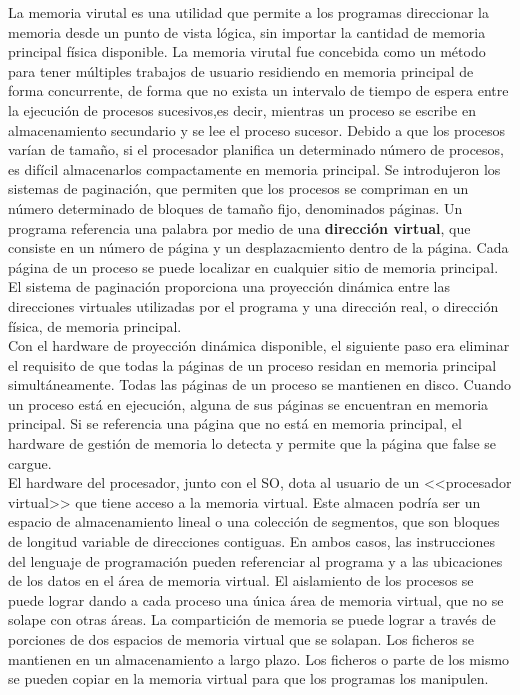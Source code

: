 \documentclass{article}
\begin{document}
				La memoria virutal es una utilidad que permite a los programas direccionar la memoria desde un punto de vista lógica, sin importar la cantidad de memoria principal física disponible. La memoria virutal fue concebida como un método para tener múltiples trabajos de usuario residiendo en memoria principal de forma concurrente, de forma que no exista un intervalo de tiempo de espera entre la ejecución de procesos sucesivos,es decir, mientras un proceso se escribe en almacenamiento secundario y se lee el proceso sucesor. Debido a que los procesos varían de tamaño, si el procesador planifica un determinado número de procesos, es difícil almacenarlos compactamente en memoria principal. Se introdujeron los sistemas de paginación, que permiten que los procesos se compriman en un número determinado de bloques de tamaño fijo, denominados páginas. Un programa referencia una palabra por medio de una \textbf{dirección virtual}, que consiste en un número de página y un desplazacmiento dentro de la página. Cada página de un proceso se puede localizar en cualquier sitio de memoria principal. El sistema de paginación proporciona una proyección dinámica entre las direcciones virtuales utilizadas por el programa y una dirección real, o dirección física, de memoria principal.	\\
				
				Con el hardware de proyección dinámica disponible, el siguiente paso era eliminar el requisito de que todas la páginas de un proceso residan en memoria principal simultáneamente. Todas las páginas de un proceso se mantienen en disco. Cuando un proceso está en ejecución, alguna de sus páginas se encuentran en memoria principal. Si se referencia una página que no está en memoria principal, el hardware de gestión de memoria lo detecta y permite que la página que false se cargue. \\
				
				El hardware del procesador, junto con el SO, dota al usuario de un <<procesador virtual>> que tiene acceso a la memoria virtual. Este almacen podría ser un espacio de almacenamiento lineal o una colección de segmentos, que son bloques de longitud variable de direcciones contiguas. En ambos casos, las instrucciones del lenguaje de programación pueden referenciar al programa y a las ubicaciones de los datos en el área de memoria virtual. El aislamiento de los procesos se puede lograr dando a cada proceso una única área de memoria virtual, que no se solape con otras áreas. La compartición de memoria se puede lograr a través de porciones de dos espacios de memoria virtual que se solapan. Los ficheros se mantienen en un almacenamiento a largo plazo. Los ficheros o parte de los mismo se pueden copiar en la memoria virtual para que los programas los manipulen.	\\
				
\end{document}
